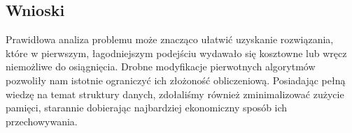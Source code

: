 \documentclass{article}
\begin{document}
\subsection*{Wnioski}
	Prawidłowa analiza problemu może znacząco ułatwić uzyskanie rozwiązania, które w pierwszym, łagodniejszym podejściu wydawało się kosztowne lub wręcz niemożliwe do osiągnięcia. Drobne modyfikacje pierwotnych algorytmów pozwoliły nam istotnie ograniczyć ich złożoność obliczeniową. Posiadając pełną wiedzę na temat struktury danych, zdołaliśmy również zminimalizować zużycie pamięci, starannie dobierając najbardziej ekonomiczny sposób ich przechowywania.
\end{document}
